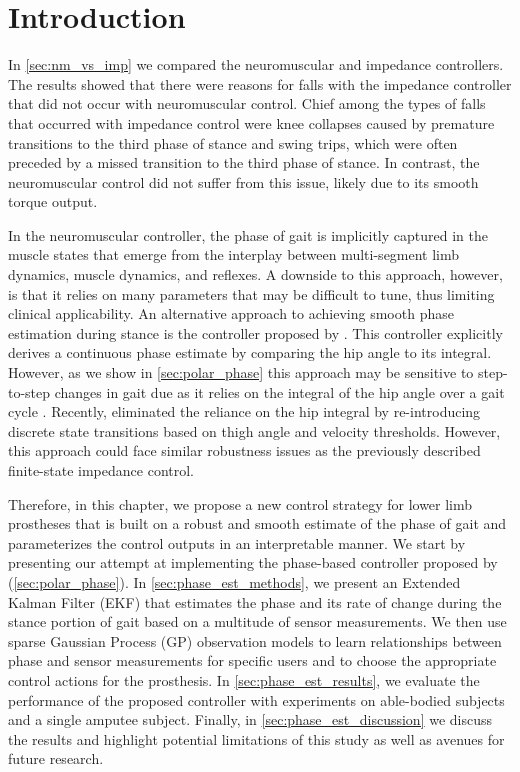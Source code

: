 \section{Introduction}\label{sec:phase_est_intro}

In \cref{sec:nm_vs_imp} we compared the neuromuscular and impedance controllers.
The results showed that there were reasons for falls with the impedance
controller that did not occur with neuromuscular control. Chief among the types
of falls that occurred with impedance control were knee collapses caused by
premature transitions to the third phase of stance and swing trips, which were
often preceded by a missed transition to the third phase of stance. In contrast,
the neuromuscular control did not suffer from this issue, likely due to its
smooth torque output.

In the neuromuscular controller, the phase of gait is implicitly captured in the
muscle states that emerge from the interplay between multi-segment limb
dynamics, muscle dynamics, and reflexes. A downside to this approach, however,
is that it relies on many parameters that may be difficult to tune, thus
limiting clinical applicability. An alternative approach to achieving smooth
phase estimation during stance is the controller proposed by
\citet{quintero2016preliminary}. This controller explicitly derives a continuous
phase estimate by comparing the hip angle to its integral. However, as we show
in \cref{sec:polar_phase} this approach may be sensitive to step-to-step changes
in gait due as it relies on the integral of the hip angle over a gait cycle .
Recently, \citet{rezazadeh2018phase} eliminated the reliance on the hip integral
by re-introducing discrete state transitions based on thigh angle and velocity
thresholds. However, this approach could face similar robustness issues as the
previously described finite-state impedance control.

Therefore, in this chapter, we propose a new control strategy for lower limb
prostheses that is built on a robust and smooth estimate of the phase of gait
and parameterizes the control outputs in an interpretable manner. We start by
presenting our attempt at implementing the phase-based controller proposed by
\citet{quintero2016preliminary} (\cref{sec:polar_phase}). In
\cref{sec:phase_est_methods}, we present an Extended Kalman Filter (EKF) that
estimates the phase and its rate of change during the stance portion of gait
based on a multitude of sensor measurements.  We then use sparse Gaussian
Process (GP) observation models to learn relationships between phase and sensor
measurements for specific users and to choose the appropriate control actions
for the prosthesis. In \cref{sec:phase_est_results}, we evaluate the performance
of the proposed controller with experiments on able-bodied subjects and a single
amputee subject. Finally, in \cref{sec:phase_est_discussion} we discuss the
results and highlight potential limitations of this study as well as avenues for
future research.

